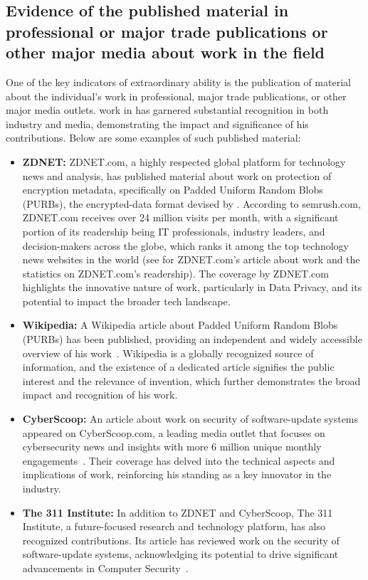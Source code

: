 \subsection{Evidence of the published material in professional or major 
	trade publications or other major media about \drs work in the field}
\label{sec:media}

One of the key indicators of extraordinary ability is the publication of
material about the individual's work in professional, major trade
publications, or other major media outlets.
\drs work in \dpcs has garnered substantial recognition in both industry and
media, demonstrating the impact and significance of his contributions.
Below are some examples of such published material:

\begin{itemize}
	\item \textbf{ZDNET:} ZDNET.com, a highly respected global platform for
	technology news and analysis, has published material about \drs
	work on protection of encryption metadata, specifically on Padded
	Uniform Random Blobs (PURBs), the encrypted-data format devised by
	\dr.
	According to semrush.com, ZDNET.com receives over 24 million visits per
	month, with a significant portion of its readership being IT
	professionals, industry leaders, and decision-makers across the globe,
	which ranks it among the top technology news websites in the
	world (see  for ZDNET.com's article about \drs work and the statistics on ZDNET.com's readership).
	The coverage by ZDNET.com highlights the innovative nature of \drs work,
	particularly in Data Privacy, and its potential to impact the broader
	tech landscape.
	\item \textbf{Wikipedia:} A Wikipedia article about Padded
	Uniform Random Blobs (PURBs) has been published, providing an independent
	and widely accessible overview of his work~\cite[A Wikipedia
	article]{media}.
	Wikipedia is a globally recognized source of information, and the
	existence of a dedicated article signifies the public interest and the
	relevance of \drs invention, which further demonstrates the broad impact and recognition of his work.
	\item \textbf{CyberScoop:} An article about \drs work on security of
	software-update systems	appeared on CyberScoop.com, a leading media
	outlet that focuses on cybersecurity news and insights with more 6
	million unique monthly engagements~\cite[CyberScoop's article about a
	framework devised by \dr]{media}.
	Their coverage has delved into the technical aspects and implications of
	\drs work, reinforcing his standing as a key innovator in the industry.
	\item \textbf{The 311 Institute:} In addition to ZDNET and CyberScoop, 
	The 311 Institute, a future-focused research and technology platform,
	has also recognized \drs contributions.
	Its article has reviewed \drs work on the security of software-update
	systems, acknowledging its potential to drive significant advancements
	in Computer Security~\cite[The 311 Institute's atricle about a framework
	devised by \dr]{media}.
\end{itemize}

